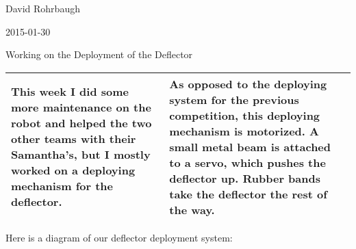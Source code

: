 David Rohrbaugh

2015-01-30

Working on the Deployment of the Deflector

\begin{tabular}{|p{5cm}|p{5cm}|}
 \hline
 This week I did some more maintenance on the robot and helped the two other teams with their Samantha's, but I mostly worked on a deploying mechanism for the deflector.
 &
 As opposed to the deploying system for the previous competition, this deploying mechanism is motorized. A small metal beam is attached to a servo, which pushes the deflector up. Rubber bands take the deflector the rest of the way.
 \\
 \hline
\end{tabular}

\medskip

Here is a diagram of our deflector deployment system:

\begin{center}
\end{center}
